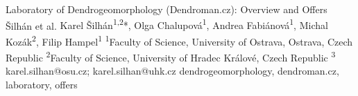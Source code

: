 {
}

\abstract
{Laboratory of Dendrogeomorphology (Dendroman.cz): Overview and Offers} 
{Šilhán et al.} 
{Karel Šilhán\textsuperscript{1,2}*, Olga Chalupová\textsuperscript{1}, Andrea Fabiánová\textsuperscript{1}, Michal Kozák\textsuperscript{2}, Filip Hampel\textsuperscript{1}} 
{\POtag} 
{
	\textsuperscript{1}Faculty of Science, University of Ostrava, Ostrava, Czech Republic
	\textsuperscript{2}Faculty of Science, University of Hradec Králové, Czech Republic
	\textsuperscript{3}
}
{karel.silhan@osu.cz; karel.silhan@uhk.cz}  %
{dendrogeomorphology, dendroman.cz, laboratory, offers}
